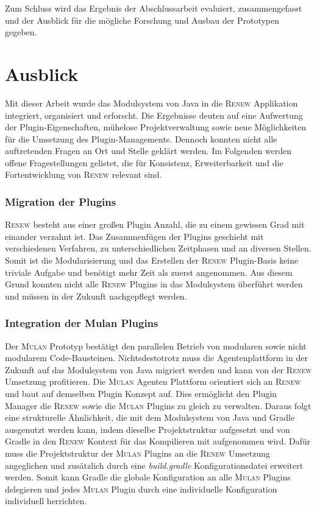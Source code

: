  Zum Schluss wird das Ergebnis der Abschlussarbeit evaluiert, zusammengefasst und der Ausblick für die mögliche Forschung und Ausbau der Prototypen gegeben. 


\section{Ausblick} 

	Mit dieser Arbeit wurde das Modulsystem von Java in die \textsc{Renew} Applikation integriert, organisiert und erforscht. Die Ergebnisse deuten auf eine Aufwertung der Plugin-Eigenschaften, mühelose Projektverwaltung sowie neue Möglichkeiten für die Umsetzung des Plugin-Managements. Dennoch konnten nicht alle auftretenden Fragen an Ort und Stelle geklärt werden.\bigbreak
	Im Folgenden werden offene Fragestellungen gelistet, die für Konsistenz, Erweiterbarkeit und die Fortentwicklung von \textsc{Renew} relevant sind. 
	
 \subsubsection{Migration der Plugins}
	\textsc{Renew} besteht aus einer großen Plugin Anzahl, die zu einem gewissen Grad mit einander verzahnt ist. Das  Zusammenfügen der Plugins geschieht mit verschiedenen Verfahren, zu unterschiedlichen Zeitphasen und an diversen Stellen. Somit ist die Modularisierung und das Erstellen der \textsc{Renew} Plugin-Basis keine triviale Aufgabe und benötigt mehr Zeit als zuerst angenommen. Aus diesem Grund konnten nicht alle \textsc{Renew} Plugins in das Modulsystem überführt werden und müssen in der Zukunft nachgepflegt werden. 

 \subsubsection{Integration der Mulan Plugins}
	Der \textsc{Mulan} Prototyp bestätigt den parallelen Betrieb von modularen sowie nicht modularem Code-Bausteinen. Nichtsdestotrotz muss die Agentenplattform in der Zukunft auf das Modulsystem von Java migriert werden und kann von der \textsc{Renew} Umsetzung profitieren.\newline 
	Die \textsc{Mulan} Agenten Plattform orientiert sich an \textsc{Renew} und baut auf demselben Plugin Konzept auf. Dies ermöglicht den Plugin Manager die \textsc{Renew} sowie die \textsc{Mulan} Plugins zu gleich zu verwalten. Daraus folgt eine strukturelle Ähnlichkeit, die mit dem Modulsystem von Java und Gradle ausgenutzt werden kann, indem dieselbe Projektstruktur aufgesetzt und von Gradle in den \textsc{Renew} Kontext für das Kompilieren mit aufgenommen wird.\newline
	Dafür muss die Projektstruktur der \textsc{Mulan} Plugins an die \textsc{Renew} Umsetzung angeglichen und zusätzlich durch eine \textit{build.gradle} Konfigurationsdatei erweitert werden. Somit kann Gradle die globale Konfiguration an alle \textsc{Mulan} Plugins delegieren und jedes \textsc{Mulan} Plugin durch eine individuelle Konfiguration individuell herrichten. 
		
